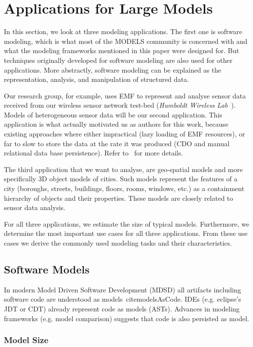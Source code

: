 \section{Applications for Large Models}
\label{sec:applications}

In this section, we look at three modeling applications. The first one is software modeling, which is what most of the MODELS community is concerned with and what the modeling frameworks mentioned in this paper were designed for. But techniques originally developed for software modeling are also used for other applications. More abstractly, software modeling can be explained as the representation, analysis, and manipulation of structured data. 

Our research group, for example, uses EMF to represent and analyse sensor data received from our wireless sensor network test-bed (\emph{Humboldt Wireless Lab}~\cite{hwl}). Models of heterogeneous sensor data will be our second application. 
This application is what actually motivated us as authors for this work, because existing approaches where either impractical (lazy loading of EMF resources), or far to slow to store the data at the rate it was produced (CDO and manual relational data base persistence). 
Refer to~\cite{clickwatch} for more details. 

The third application that we want to analyse, are geo-spatial models and more specifically 3D object models of cities. Such models represent the features of a city (boroughs, streets, buildings, floors, rooms, windows, etc.) as a containment hierarchy of objects and their properties. 
These models are closely related to sensor data analysis.

For all three applications, we estimate the size of typical models. Furthermore, we determine the most important use cases for all three applications. From these use cases we derive the commonly used modeling tasks and their characteristics.

\subsection{Software Models}
In modern Model Driven Software Development (MDSD) all artifacts including software code are understood as models~cite{modelsAsCode}. IDEs (e.g. eclipse's JDT or CDT) already represent code as models (ASTs). Advances in modeling frameworks (e.g. model comparison) suggests that code is also persisted as model.

\subsubsection*{Model Size}

